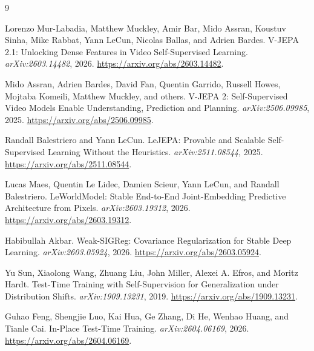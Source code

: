 \documentclass[10pt]{article}
\begin{document}
\begin{thebibliography}{9}

Lorenzo Mur-Labadia, Matthew Muckley, Amir Bar, Mido Assran, Koustuv Sinha,
Mike Rabbat, Yann LeCun, Nicolas Ballas, and Adrien Bardes.
\newblock V-JEPA 2.1: Unlocking Dense Features in Video Self-Supervised
Learning.
\newblock \emph{arXiv:2603.14482}, 2026.
\newblock \url{https://arxiv.org/abs/2603.14482}.

Mido Assran, Adrien Bardes, David Fan, Quentin Garrido, Russell Howes, Mojtaba
Komeili, Matthew Muckley, and others.
\newblock V-JEPA 2: Self-Supervised Video Models Enable Understanding,
Prediction and Planning.
\newblock \emph{arXiv:2506.09985}, 2025.
\newblock \url{https://arxiv.org/abs/2506.09985}.

Randall Balestriero and Yann LeCun.
\newblock LeJEPA: Provable and Scalable Self-Supervised Learning Without the
Heuristics.
\newblock \emph{arXiv:2511.08544}, 2025.
\newblock \url{https://arxiv.org/abs/2511.08544}.

Lucas Maes, Quentin Le Lidec, Damien Scieur, Yann LeCun, and Randall
Balestriero.
\newblock LeWorldModel: Stable End-to-End Joint-Embedding Predictive
Architecture from Pixels.
\newblock \emph{arXiv:2603.19312}, 2026.
\newblock \url{https://arxiv.org/abs/2603.19312}.

Habibullah Akbar.
\newblock Weak-SIGReg: Covariance Regularization for Stable Deep Learning.
\newblock \emph{arXiv:2603.05924}, 2026.
\newblock \url{https://arxiv.org/abs/2603.05924}.

Yu Sun, Xiaolong Wang, Zhuang Liu, John Miller, Alexei A. Efros, and Moritz
Hardt.
\newblock Test-Time Training with Self-Supervision for Generalization under
Distribution Shifts.
\newblock \emph{arXiv:1909.13231}, 2019.
\newblock \url{https://arxiv.org/abs/1909.13231}.

Guhao Feng, Shengjie Luo, Kai Hua, Ge Zhang, Di He, Wenhao Huang, and Tianle
Cai.
\newblock In-Place Test-Time Training.
\newblock \emph{arXiv:2604.06169}, 2026.
\newblock \url{https://arxiv.org/abs/2604.06169}.

\end{thebibliography}
\end{document}
